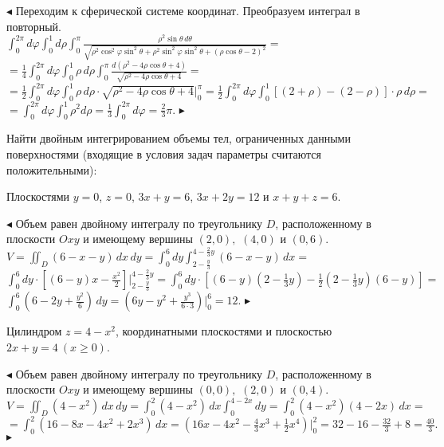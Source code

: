 \documentclass[a5paper,10pt]{article}
\begin{document}
\smallskip
\noindent $\blacktriangleleft$ Переходим к сферической системе координат.
Преобразуем интеграл в повторный.\\
$\displaystyle\int_0^{2\pi}d\varphi\int_0^1d\rho\int_0^{\pi}\frac{\rho^2\sin\theta\,d\theta}
{\sqrt{\rho^2\cos^2\varphi\sin^2\theta+\rho^2\sin^2\varphi\sin^2\theta+
(\rho\cos\theta-2)^2}}=$\\
$\displaystyle=\frac14\int_0^{2\pi}d\varphi\int_0^1\rho\,d\rho\int_0^{\pi}\frac{d(\rho^2-4\rho\cos\theta+4)}
{\sqrt{\rho^2-4\rho\cos\theta+4}}=$\\
$\displaystyle=\frac12\int_0^{2\pi}d\varphi\int_0^1\rho\,d\rho\cdot\sqrt{\rho^2-4\rho\cos\theta+4}\Big|_0^{\pi}=
\frac12\int_0^{2\pi}d\varphi\int_0^1[(2+\rho)-(2-\rho)]\cdot\rho\,d\rho=$\\
$\displaystyle=\int_0^{2\pi}d\varphi\int_0^1\rho^2d\rho=\frac13\int_0^{2\pi}d\varphi=\frac23\pi.$
$\blacktriangleright$

\medskip
\noindent Найти двойным интегрированием объемы тел, ограниченных данными
поверхностями (входящие в условия задач параметры считаются положительными):

\medskip
{} Плоскостями $y=0$, $z=0$, $3x+y=6$, $3x+2y=12$ и $x+y+z=6$.

\smallskip
\noindent $\blacktriangleleft$ Объем равен двойному интегралу по треугольнику $D$,
расположенному в плоскости $Oxy$ и имеющему вершины $(2,0),$ $(4,0)$ и $(0,6).$\\
$\displaystyle V=\iint_D(6-x-y)\,dx\,dy=\int_0^6dy\int_{2-\frac y3}^{4-\frac23y}(6-x-y)\,dx=$\\
$\displaystyle\int_0^6dy\cdot\left[(6-y)x-\frac{x^2}{2}\right]\Big|_{2-\frac y3}^{4-\frac23y}=
\int_0^6dy\cdot\left[(6-y)\left(2-\frac13y\right)-\frac12\left(2-\frac13y\right)(6-y)\right]=$\\
$\displaystyle\int_0^6\left(6-2y+\frac{y^2}{6}\right)\,dy=
\left(6y-y^2+\frac{y^3}{6\cdot3}\right)\Big|_0^6=12.$
$\blacktriangleright$

\medskip
{} Цилиндром $z=4-x^2$, координатными плоскостями и плоскостью\\
$2x+y=4\ (x\ge0)$.

\smallskip
\noindent $\blacktriangleleft$ Объем равен двойному интегралу по треугольнику $D$,
расположенному в плоскости $Oxy$ и имеющему вершины $(0,0),$ $(2,0)$ и $(0,4).$\\
$\displaystyle V=\iint_D(4-x^2)\,dx\,dy=\int_0^2(4-x^2)\,dx\int_{0}^{4-2x}dy=
\int_0^2(4-x^2)(4-2x)\,dx=$\\
$\displaystyle =\int_0^2(16-8x-4x^2+2x^3)\,dx=\left(16x-4x^2-\frac43x^3+\frac12x^4\right)\Big|_0^2=
32-16-\frac{32}{3}+8=\frac{40}{3}.$\\
$\blacktriangleright$
\end{document}
